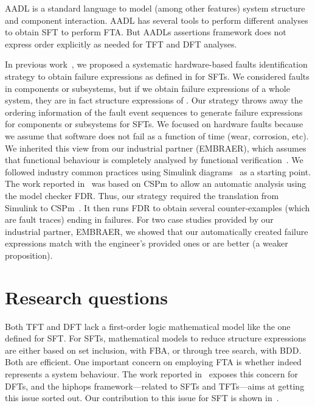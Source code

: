 \documentclass[12pt,openright,twoside,a4paper,oldfontcommands,english,brazil,final]{abntex2}
\theoremstyle{theo}
\newcommand{\EMBRAER}{EMBRAER\xspace}
\newcommand{\simulink}{Simulink\xspace}
\begin{document}
\Ac{AADL} is a standard language to model (among other features) system structure and component interaction. 
\Ac{AADL} has several tools to perform different analyses to obtain \ac{SFT} to perform \ac{FTA}.
But \acp{AADL} assertions framework does not express order explicitly as needed for \ac{TFT} and \ac{DFT} analyses.

In previous work~\cite{Didier2012,DM2012}, we proposed a systematic hardware-based faults identification strategy to obtain failure expressions as defined in  for \acp{SFT}.
%
We considered faults in components or subsystems, but if we obtain failure expressions of a whole system, they are in fact structure expressions of .
%
Our strategy throws away the ordering information of the fault event sequences to generate failure expressions for components or subsystems for \acp{SFT}.
%
%
We focused on hardware faults because we assume that software does not fail as a function of time (wear, corrosion, etc).
%
We inherited this view from our industrial partner (\EMBRAER), which assumes that functional behaviour is completely analysed by functional verification~\cite{SP2011}.
%
We followed industry common practices using \simulink diagrams~\cite{Nise1992} as a starting point.
%
The work reported in~\cite{DM2012} was based on \ac{CSPm} to allow an automatic analysis using the model checker \acs{FDR}.
%
Thus, our strategy required the translation from \simulink to \ac{CSPm}~\cite{JMS+2011}.
%
It then runs \acs{FDR} to obtain several counter-examples (which are fault traces) ending in failures.
%
For two case studies provided by our industrial partner, \EMBRAER, we showed that our automatically created failure expressions match with the engineer's provided ones or are better (a weaker proposition).

\section{Research questions}
\label{sec:research-questions}

Both \ac{TFT} and \ac{DFT} lack a first-order logic mathematical model like the one defined for \ac{SFT}.
For \acp{SFT}, mathematical models to reduce structure expressions are either based on set inclusion, with \ac{FBA}, or through tree search, with \ac{BDD}.
Both are efficient.
One important concern on employing \ac{FTA} is whether  indeed represents a system behaviour.
The work reported in~\cite{MCS+1999} exposes this concern for \acp{DFT}, and the \ac{hiphops} framework---related to \acp{SFT} and \acp{TFT}---aims at getting this issue sorted out.
Our contribution to this issue for \ac{SFT} is shown in~\cite{DM2012,Didier2012}.
\end{document}
